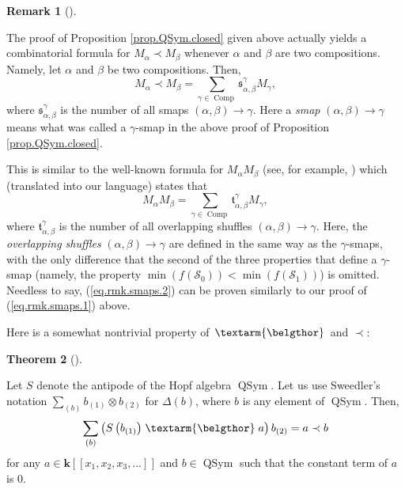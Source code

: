 \documentclass
[numbers=enddot,12pt,final,onecolumn,notitlepage,abstracton]{scrartcl}%
\theoremstyle{definition}
\newtheorem{theo}{Theorem}[section]
\newenvironment{theorem}[1][]
{\begin{theo}[#1]\begin{leftbar}}
{\end{leftbar}\end{theo}}
\newtheorem{remk}[theo]{Remark}
\newenvironment{remark}[1][]
{\begin{remk}[#1]\begin{leftbar}}
{\end{leftbar}\end{remk}}
\newcommand{\bel}{\left. \textarm{\belgthor} \right.}
\let\sumnonlimits\sum
\renewcommand{\sum}{\sumnonlimits\limits}
\begin{document}
\begin{remark}
\label{rmk.QSym.closed}The proof of Proposition \ref{prop.QSym.closed} given
above actually yields a combinatorial formula for $M_{\alpha}\left.
\prec\right.  M_{\beta}$ whenever $\alpha$ and $\beta$ are two compositions.
Namely, let $\alpha$ and $\beta$ be two compositions. Then,%
\begin{equation}
M_{\alpha}\left.  \prec\right.  M_{\beta}=\sum_{\gamma\in\operatorname*{Comp}%
}\mathfrak{s}_{\alpha,\beta}^{\gamma}M_{\gamma}, \label{eq.rmk.smaps.1}%
\end{equation}
where $\mathfrak{s}_{\alpha,\beta}^{\gamma}$ is the number of all smaps
$\left(  \alpha,\beta\right)  \rightarrow\gamma$. Here a \textit{smap}
$\left(  \alpha,\beta\right)  \rightarrow\gamma$ means what was called a
$\gamma$-smap in the above proof of Proposition \ref{prop.QSym.closed}.

This is similar to the well-known formula for $M_{\alpha}M_{\beta}$ (see, for
example, \cite[Proposition 5.1.3]{Reiner}) which (translated into our
language) states that
\begin{equation}
M_{\alpha}M_{\beta}=\sum_{\gamma\in\operatorname*{Comp}}\mathfrak{t}%
_{\alpha,\beta}^{\gamma}M_{\gamma}, \label{eq.rmk.smaps.2}%
\end{equation}
where $\mathfrak{t}_{\alpha,\beta}^{\gamma}$ is the number of all overlapping
shuffles $\left(  \alpha,\beta\right)  \rightarrow\gamma$. Here, the
\textit{overlapping shuffles} $\left(  \alpha,\beta\right)  \rightarrow\gamma$
are defined in the same way as the $\gamma$-smaps, with the only difference
that the second of the three properties that define a $\gamma$-smap (namely,
the property $\min\left(  f\left(  \mathcal{S}_{0}\right)  \right)
<\min\left(  f\left(  \mathcal{S}_{1}\right)  \right)  $) is omitted. Needless
to say, (\ref{eq.rmk.smaps.2}) can be proven similarly to our proof of
(\ref{eq.rmk.smaps.1}) above.
\end{remark}

Here is a somewhat nontrivial property of $\bel $ and $\left.  \prec\right.  $:

\begin{theorem}
\label{thm.beldend}Let $S$ denote the antipode of the Hopf algebra
$\operatorname*{QSym}$. Let us use Sweedler's notation $\sum_{\left(
b\right)  }b_{\left(  1\right)  }\otimes b_{\left(  2\right)  }$ for
$\Delta\left(  b\right)  $, where $b$ is any element of $\operatorname*{QSym}%
$. Then,%
\[
\sum_{\left(  b\right)  }\left(  S\left(  b_{\left(  1\right)  }\right)
\bel
a\right)  b_{\left(  2\right)  }=a\left.  \prec\right.  b
\]
for any $a\in\mathbf{k}\left[  \left[  x_{1},x_{2},x_{3},\ldots\right]
\right]  $ and $b\in\operatorname*{QSym}$ such that the constant term of $a$
is $0$.
\end{theorem}
\end{document}

